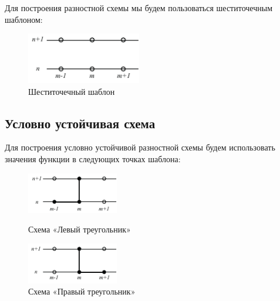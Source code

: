 \documentclass[titlepage]{article}
\begin{document}
Для построения разностной схемы мы будем пользоваться шеститочечным шаблоном: 

\begin{figure}[h]
\center
\includegraphics[width = 50mm]{img2.pdf}
\caption{Шеститочечный шаблон}
\end{figure}

\subsection{Условно устойчивая схема}
Для построения условно устойчивой разностной схемы будем использовать значения функции в следующих точках шаблона: 


\begin{figure}
\centering
\begin{minipage}{.5\textwidth}
  \centering
  \includegraphics[width = 40mm]{img3.pdf}
  \caption{Схема «Левый треугольник»}
  \label{fig:test1}
\end{minipage}%
\begin{minipage}{.5\textwidth}
  \centering
  \includegraphics[width = 40mm]{img4.pdf}
  \caption{Схема «Правый треугольник»}
\end{minipage}
\end{figure}

\break
\end{document}
